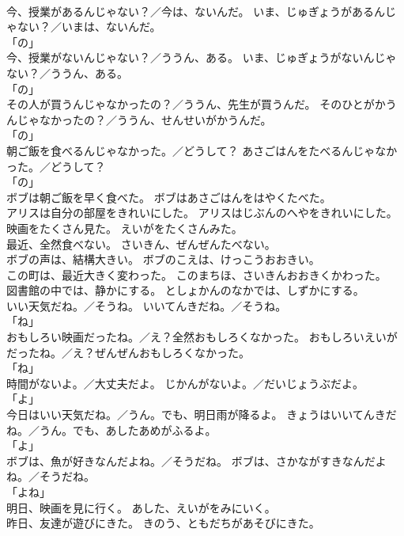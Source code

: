 \documentclass[8pt]{extreport}
\begin{document}
\begin{CJK}{UTF8}{min}
\\	今、授業があるんじゃない？／今は、ないんだ。	いま、じゅぎょうがあるんじゃない？／いまは、ないんだ。	
\\	「の」 
\\	今、授業がないんじゃない？／ううん、ある。	いま、じゅぎょうがないんじゃない？／ううん、ある。	
\\	「の」 
\\	その人が買うんじゃなかったの？／ううん、先生が買うんだ。	そのひとがかうんじゃなかったの？／ううん、せんせいがかうんだ。	
\\	「の」 
\\	朝ご飯を食べるんじゃなかった。／どうして？	あさごはんをたべるんじゃなかった。／どうして？	
\\	「の」 
\\	ボブは朝ご飯を早く食べた。	ボブはあさごはんをはやくたべた。	
\\	アリスは自分の部屋をきれいにした。	アリスはじぶんのへやをきれいにした。	
\\	映画をたくさん見た。	えいがをたくさんみた。	
\\	最近、全然食べない。	さいきん、ぜんぜんたべない。	
\\	ボブの声は、結構大きい。	ボブのこえは、けっこうおおきい。	
\\	この町は、最近大きく変わった。	このまちほ、さいきんおおきくかわった。	
\\	図書館の中では、静かにする。	としょかんのなかでは、しずかにする。	
\\	いい天気だね。／そうね。	いいてんきだね。／そうね。	
\\	「ね」 
\\	おもしろい映画だったね。／え？全然おもしろくなかった。	おもしろいえいがだったね。／え？ぜんぜんおもしろくなかった。	
\\	「ね」 
\\	時間がないよ。／大丈夫だよ。	じかんがないよ。／だいじょうぶだよ。	
\\	「よ」 
\\	今日はいい天気だね。／うん。でも、明日雨が降るよ。	きょうはいいてんきだね。／うん。でも、あしたあめがふるよ。	
\\	「よ」 
\\	ボブは、魚が好きなんだよね。／そうだね。	ボブは、さかながすきなんだよね。／そうだね。	
\\	「よね」	
\\	明日、映画を見に行く。	あした、えいがをみにいく。	
\\	昨日、友達が遊びにきた。	きのう、ともだちがあそびにきた。	

\end{CJK}
\end{document}
